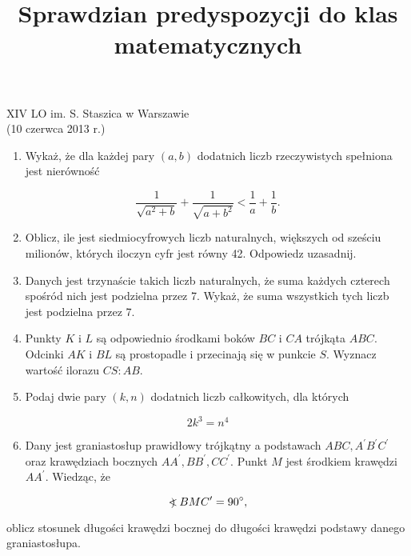\documentclass[10pt]{article}
\title{Sprawdzian predyspozycji do klas matematycznych }
\author{}
\date{}
\newcommand\Varangle{\mathop{{<\!\!\!\!\!\text{\small)}}\:}\nolimits}
\begin{document}
\maketitle
XIV LO im. S. Staszica w Warszawie\\
(10 czerwca 2013 r.)

\begin{enumerate}
  \item Wykaż, że dla każdej pary \((a, b)\) dodatnich liczb rzeczywistych spełniona jest nierówność
\end{enumerate}

\[
\frac{1}{\sqrt{a^{2}+b}}+\frac{1}{\sqrt{a+b^{2}}}<\frac{1}{a}+\frac{1}{b} .
\]

\begin{enumerate}
  \setcounter{enumi}{1}
  \item Oblicz, ile jest siedmiocyfrowych liczb naturalnych, większych od sześciu milionów, których iloczyn cyfr jest równy 42. Odpowiedz uzasadnij.
  \item Danych jest trzynaście takich liczb naturalnych, że suma każdych czterech spośród nich jest podzielna przez 7. Wykaż, że suma wszystkich tych liczb jest podzielna przez 7.
  \item Punkty \(K\) i \(L\) są odpowiednio środkami boków \(B C\) i \(C A\) trójkąta \(A B C\). Odcinki \(A K\) i \(B L\) są prostopadle i przecinają się w punkcie \(S\). Wyznacz wartość ilorazu \(C S: A B\).
  \item Podaj dwie pary \((k, n)\) dodatnich liczb całkowitych, dla których
\end{enumerate}

\[
2 k^{3}=n^{4}
\]

\begin{enumerate}
  \setcounter{enumi}{5}
  \item Dany jest graniastosłup prawidłowy trójkątny a podstawach \(A B C, A^{\prime} B^{\prime} C^{\prime}\) oraz krawędziach bocznych \(A A^{\prime}, B B^{\prime}, C C^{\prime}\). Punkt \(M\) jest środkiem krawędzi \(A A^{\prime}\). Wiedząc, że
\end{enumerate}

\[
\Varangle B M C^{\prime}=90^{\circ},
\]

oblicz stosunek długości krawędzi bocznej do długości krawędzi podstawy danego graniastosłupa.
\end{document}
